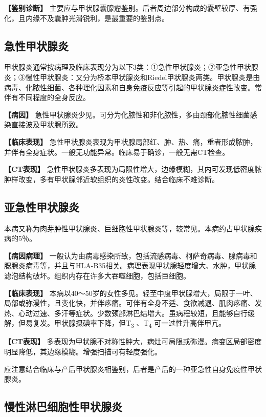 \textbf{【鉴别诊断】}
主要应与甲状腺囊腺瘤鉴别。后者周边部分构成的囊壁较厚、有强化，且内缘不及囊肿光滑锐利，是最重要的鉴别点。

\subsection{急性甲状腺炎}

甲状腺炎通常按病理及临床表现分为以下3类：①急性甲状腺炎；②亚急性甲状腺炎；③慢性甲状腺炎：又分为桥本甲状腺炎和Riedel甲状腺炎两类。甲状腺炎是由病毒、化脓性细菌、各种理化因素和自身免疫反应等引起的甲状腺炎症性改变。常伴有不同程度的全身反应。

\textbf{【病因】}
急性甲状腺炎少见。可分为化脓性和非化脓性，多由颈部化脓性细菌感染直接波及甲状腺所致。

\textbf{【临床表现】}
急性甲状腺炎表现为甲状腺局部红、肿、热、痛，重者形成脓肿，并伴有全身症状。一般无功能异常。临床易于确诊，一般无需CT检查。

\textbf{【CT表现】}
急性甲状腺炎多表现为局限性增大，边缘模糊，其内可发现低密度脓肿样改变，多有甲状腺邻近软组织的炎性改变。结合临床不难诊断。

\subsection{亚急性甲状腺炎}

本病又称为肉芽肿性甲状腺炎、巨细胞性甲状腺炎等，较常见。本病约占甲状腺疾病的5％。

\textbf{【病因病理】}
一般认为由病毒感染所致，包括流感病毒、柯萨奇病毒、腺病毒和腮腺炎病毒等，并且与HLA-B35相关。病理表现甲状腺轻度增大、水肿，甲状腺滤泡结构破坏。组织内存在许多大吞噬细胞，包括巨细胞。

\textbf{【临床表现】}
本病以40～50岁的女性多见。轻至中度甲状腺增大，局限于一叶、局部或弥漫性，且变化快，并伴疼痛。可伴有全身不适、食欲减退、肌肉疼痛、发热、心动过速、多汗等症状。少数颈部淋巴结增大。虽病程较短，且能够自行缓解，但易复发。甲状腺摄碘率下降，但T\textsubscript{3}
、T\textsubscript{4} 可一过性升高伴甲亢。

\textbf{【CT表现】}
多表现为甲状腺不对称性肿大，病灶可局限或弥漫。病变区局部密度明显降低，其边缘模糊。增强扫描可有轻度强化。

应注意结合临床与产后甲状腺炎相鉴别，后者是产后的一种亚急性自身免疫性甲状腺炎。

\subsection{慢性淋巴细胞性甲状腺炎}

